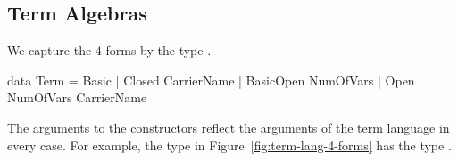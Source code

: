 \subsection{Term Algebras}
\begin{comment}
We differentiate between $4$ different forms of term languages that differ in their expressive power, as shown in Figure~\ref{fig:term-lang-4-forms}. 
\begin{figure}
    
    \caption{The term language of \lstmath{Monoid} expressed in $4$ different ways.}
    \label{fig:term-lang-4-forms}
\end{figure}

The \lstmath{Basic} term language defines expressions created using the function symbols of the theory. At this level of abstraction, referring to elements of the carrier is not possible.
Considering, for example, the binary operation of the basic \lstmath{Monoid} term language in Figure~\ref{fig:term-lang-4-forms}, \lstmath{opL}. Its arguments are either the constant \lstmath{eL} or another call for \lstmath{opL}. 
\lstmath{Closed} term languages solve this problem by providing the \lstmath{sing} constructor, abbreviation for \emph{singleton}, that lifts element of type \lstmath{A} into instances of the closed term language. Assuming that the carrier is the type of natural numbers \lstmath{Nat}, a possible term in the language would be \lstmath{opCl (sing (suc zero)) eCl}. 

\lstmath{Open} term languages provides extra constructor to represent variables, represented using the \lstmath{Fin} type. The two open term languages are shown on the right hand side of Figure~\ref{fig:term-lang-4-forms}.  
\end{comment} 
We capture the $4$ forms by the type . 
\begin{hscode}
data Term = Basic
          | Closed CarrierName
          | BasicOpen NumOfVars
          | Open NumOfVars CarrierName
\end{hscode}
\noindent The arguments to the constructors reflect the arguments of the term language in every case. For example, the type  in Figure~\ref{fig:term-lang-4-forms} has the type . 


